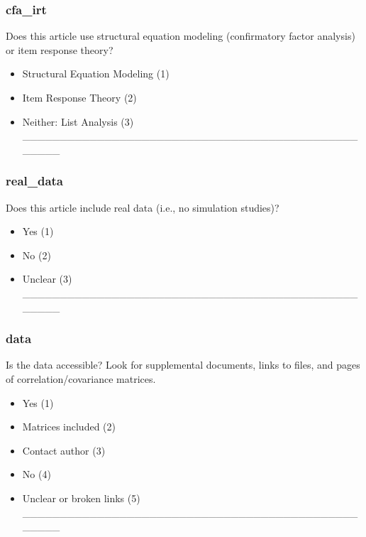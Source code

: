 \documentclass[
  english,
  man]{apa7}
\providecommand{\tightlist}{%
  \setlength{\itemsep}{0pt}\setlength{\parskip}{0pt}}
\begin{document}
\subsubsection{cfa\_irt}\label{cfa_irt}

Does this article use structural equation modeling (confirmatory factor analysis) or item response theory?

\begin{itemize}
\tightlist
\item
  Structural Equation Modeling (1)
\item
  Item Response Theory (2)
\item
  Neither: List Analysis (3) \_\_\_\_\_\_\_\_\_\_\_\_\_\_\_\_\_\_\_\_\_\_\_\_\_\_\_\_\_\_\_\_\_\_\_\_\_\_\_\_\_\_\_\_\_\_\_\_\_\_
\end{itemize}

\subsubsection{real\_data}\label{real_data}

Does this article include real data (i.e., no simulation studies)?

\begin{itemize}
\tightlist
\item
  Yes (1)
\item
  No (2)
\item
  Unclear (3) \_\_\_\_\_\_\_\_\_\_\_\_\_\_\_\_\_\_\_\_\_\_\_\_\_\_\_\_\_\_\_\_\_\_\_\_\_\_\_\_\_\_\_\_\_\_\_\_\_\_
\end{itemize}

\subsubsection{data}\label{data}

Is the data accessible? Look for supplemental documents, links to files, and pages of correlation/covariance matrices.

\begin{itemize}
\tightlist
\item
  Yes (1)
\item
  Matrices included (2)
\item
  Contact author (3)
\item
  No (4)
\item
  Unclear or broken links (5) \_\_\_\_\_\_\_\_\_\_\_\_\_\_\_\_\_\_\_\_\_\_\_\_\_\_\_\_\_\_\_\_\_\_\_\_\_\_\_\_\_\_\_\_\_\_\_\_\_\_
\end{itemize}
\end{document}
